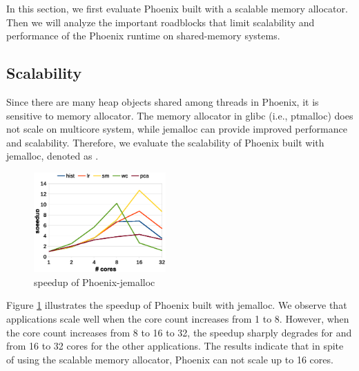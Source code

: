 In this section, we first evaluate Phoenix built with a scalable memory allocator.
Then we will analyze the important roadblocks that limit scalability and performance of the Phoenix runtime on shared-memory systems.



\subsection{Scalability}
Since there are many heap objects shared among threads in Phoenix, it is sensitive to memory allocator\cite{yoo2009phoenix2}.
The memory allocator in glibc (i.e.,  ptmalloc\cite{gloger1997ptmalloc}) does not scale on multicore system, while jemalloc\cite{evans2006jemalloc} can provide improved performance and scalability. 
Therefore, we evaluate the scalability of Phoenix built with jemalloc, denoted as .

\begin{figure}[!h!t]  
	\centering
	\includegraphics[width=0.45\textwidth]{eps/phoenix_speedup_jemalloc.eps}
	\caption{speedup of Phoenix-jemalloc}
	\label{fig:phoenix:speedup:jemalloc}
\end{figure}


Figure \ref{fig:phoenix:speedup:jemalloc} illustrates the speedup of Phoenix built with jemalloc.
We observe that applications scale well when the core count increases from 1 to 8.
However, when the core count increases from 8 to 16 to 32, the speedup sharply degrades for  and from 16 to 32 cores for the other applications.
The results indicate that in spite of using the scalable memory allocator, Phoenix can not scale up to 16 cores.


